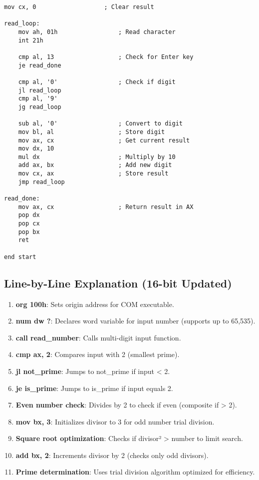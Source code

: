 \documentclass[12pt,a4paper]{article}
\begin{document}
\begin{lstlisting}[caption=16-bit Prime Check Program with Multi-Digit Support]
    mov cx, 0                   ; Clear result
    
read_loop:
    mov ah, 01h                 ; Read character
    int 21h
    
    cmp al, 13                  ; Check for Enter key
    je read_done
    
    cmp al, '0'                 ; Check if digit
    jl read_loop
    cmp al, '9'
    jg read_loop
    
    sub al, '0'                 ; Convert to digit
    mov bl, al                  ; Store digit
    mov ax, cx                  ; Get current result
    mov dx, 10
    mul dx                      ; Multiply by 10
    add ax, bx                  ; Add new digit
    mov cx, ax                  ; Store result
    jmp read_loop

read_done:
    mov ax, cx                  ; Return result in AX
    pop dx
    pop cx
    pop bx
    ret

end start
\end{lstlisting}

\subsection{Line-by-Line Explanation (16-bit Updated)}

\begin{enumerate}
\item \textbf{org 100h}: Sets origin address for COM executable.
\item \textbf{num dw ?}: Declares word variable for input number (supports up to 65,535).
\item \textbf{call read\_number}: Calls multi-digit input function.
\item \textbf{cmp ax, 2}: Compares input with 2 (smallest prime).
\item \textbf{jl not\_prime}: Jumps to not\_prime if input < 2.
\item \textbf{je is\_prime}: Jumps to is\_prime if input equals 2.
\item \textbf{Even number check}: Divides by 2 to check if even (composite if > 2).
\item \textbf{mov bx, 3}: Initializes divisor to 3 for odd number trial division.
\item \textbf{Square root optimization}: Checks if divisor² > number to limit search.
\item \textbf{add bx, 2}: Increments divisor by 2 (checks only odd divisors).
\item \textbf{Prime determination}: Uses trial division algorithm optimized for efficiency.
\end{enumerate}
\end{document}
